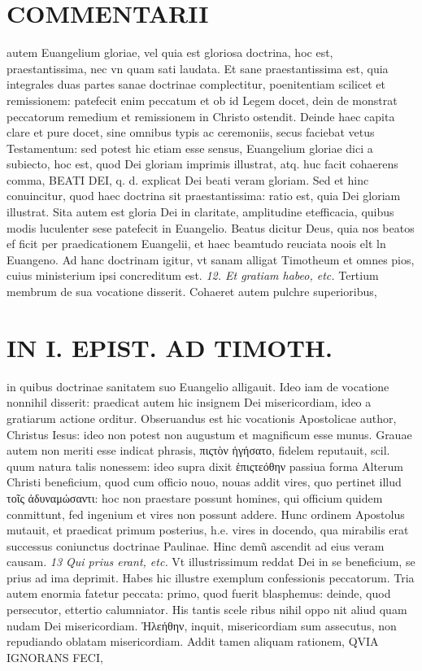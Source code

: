 \documentclass{article}
\begin{document}
\begin{pages}
\section*{COMMENTARII }
\marginpar{[ p.30 ]}\pstart autem Euangelium gloriae, vel quia est gloriosa doctrina, hoc est, praestantissima, nec vn quam sati laudata.  \pend\pstart Et sane praestantissima est, quia integrales duas partes sanae doctrinae complectitur, poenitentiam scilicet et remissionem: patefecit enim peccatum et ob id Legem docet, dein de monstrat peccatorum remedium et remissionem in Christo ostendit. Deinde haec capita clare et pure docet, sine omnibus typis ac ceremoniis, secus faciebat vetus Testamentum: sed potest hic etiam esse sensus, Euangelium gloriae dici a subiecto, hoc est, quod Dei gloriam imprimis illustrat, atq. huc facit cohaerens comma, BEATI DEI, q. d. explicat Dei beati veram gloriam. Sed et hinc conuincitur, quod haec doctrina sit praestantissima: ratio est, quia Dei gloriam illustrat. Sita autem est gloria Dei in claritate, amplitudine etefficacia, quibus modis luculenter sese patefecit in Euangelio. Beatus dicitur Deus, quia nos beatos ef ficit per praedicationem Euangelii, et haec beamtudo reuciata noois elt ln Euangeno.  \pend\pstart Ad hanc doctrinam igitur, vt sanam alligat Timotheum et omnes pios, cuius ministerium ipsi concreditum est.  \pend
\textit{12. Et gratiam habeo, etc. }\pstart Tertium membrum de sua vocatione disserit. Cohaeret autem pulchre superioribus,  \pend
\section*{IN I. EPIST. AD TIMOTH. }
\marginpar{[ p.31 ]}\pstart in quibus doctrinae sanitatem suo Euangelio alligauit. Ideo iam de vocatione nonnihil disserit: praedicat autem hic insignem Dei misericordiam, ideo a gratiarum actione orditur. Obseruandus est hic vocationis Apostolicae author, Christus Iesus: ideo non potest non augustum et magnificum esse munus. Grauae autem non meriti esse indicat phrasis, πιςτὸν ἡγήσατο, fidelem reputauit, scil. quum natura talis nonessem: ideo supra dixit ἑπιςτεόθην passiua forma Alterum Christi beneficium, quod cum officio nouo, nouas addit vires, quo pertinet illud τοῖς ἀδυναμώσαντι: hoc non praestare possunt homines, qui officium quidem conmittunt, fed ingenium et vires non possunt addere. Hunc ordinem Apostolus mutauit, et praedicat primum posterius, h.e. vires in docendo, qua mirabilis erat successus coniunctus doctrinae Paulinae. Hinc demũ ascendit ad eius veram causam.  \pend
\textit{13 Qui prius erant, etc. }\pstart Vt illustrissimum reddat Dei in se beneficium, se prius ad ima deprimit. Habes hic illustre exemplum confessionis peccatorum. Tria autem enormia fatetur peccata: primo, quod fuerit blasphemus: deinde, quod persecutor, ettertio calumniator. His tantis scele ribus nihil oppo nit aliud quam nudam Dei misericordiam. Ἠλεήθην, inquit, misericordiam sum assecutus, non repudiando oblatam misericordiam. Addit tamen aliquam rationem, QVIA IGNORANS FECI,  \pend

\end{pages}
\end{document}
